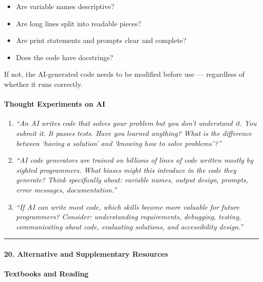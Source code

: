 \documentclass[
  justified,
  openright,
]{tufte-book}
\let\subsection\paragraph
\let\paragraph\paragraph
\let\subsection\paragraph
\let\paragraph\paragraph
\providecommand{\tightlist}{%
  \setlength{\itemsep}{0pt}\setlength{\parskip}{0pt}}
\begin{document}
\begin{itemize}
\tightlist
\item
  Are variable names descriptive?
\item
  Are long lines split into readable pieces?
\item
  Are print statements and prompts clear and complete?
\item
  Does the code have docstrings?
\end{itemize}

If not, the AI-generated code needs to be modified before use ---
regardless of whether it runs correctly.

\subsection{Thought Experiments on
AI}\label{thought-experiments-on-ai}

\begin{enumerate}
\def\labelenumi{\arabic{enumi}.}
\item
  \emph{``An AI writes code that solves your problem but you don't
  understand it. You submit it. It passes tests. Have you learned
  anything? What is the difference between `having a solution' and
  `knowing how to solve problems'?''}
\item
  \emph{``AI code generators are trained on billions of lines of code
  written mostly by sighted programmers. What biases might this
  introduce in the code they generate? Think specifically about:
  variable names, output design, prompts, error messages,
  documentation.''}
\item
  \emph{``If AI can write most code, which skills become more valuable
  for future programmers? Consider: understanding requirements,
  debugging, testing, communicating about code, evaluating solutions,
  and accessibility design.''}
\end{enumerate}

\begin{center}\rule{0.5\linewidth}{0.5pt}\end{center}

\subsection{20. Alternative and Supplementary
Resources}\label{alternative-and-supplementary-resources}

\subsection{Textbooks and Reading}\label{textbooks-and-reading}
\end{document}
